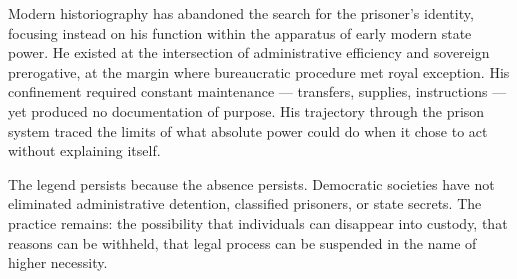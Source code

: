 Modern historiography has abandoned the search for the prisoner's identity, focusing instead on his function within the apparatus of early modern state power. He existed at the intersection of administrative efficiency and sovereign prerogative, at the margin where bureaucratic procedure met royal exception. His confinement required constant maintenance — transfers, supplies, instructions — yet produced no documentation of purpose. His trajectory through the prison system traced the limits of what absolute power could do when it chose to act without explaining itself.

The legend persists because the absence persists. Democratic societies have not eliminated administrative detention, classified prisoners, or state secrets. The practice remains: the possibility that individuals can disappear into custody, that reasons can be withheld, that legal process can be suspended in the name of higher necessity. 

\newpage


